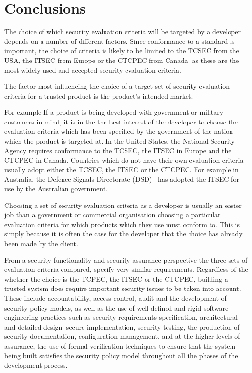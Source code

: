 \chapter{Conclusions}

The choice of which security evaluation criteria will be targeted by a
developer depends on a number of different factors. Since conformance to
a standard is important, the choice of criteria is likely to be limited
to the TCSEC from the USA, the ITSEC from Europe or the CTCPEC from Canada, 
as these are the most widely used and accepted security evaluation criteria.

The factor most influencing the choice of a target set of security
evaluation criteria for a trusted product is the product's intended
market.

For example If a product is being developed with government or military customers in
mind, it is in the the best interest of the developer to choose the
evaluation criteria which has been specified by the government of the
nation which the product is targeted at. In the United States, the
National Security Agency requires conformance to the TCSEC, the ITSEC in
Europe and the CTCPEC in Canada. Countries which do not have their own
evaluation criteria usually adopt either the TCSEC, the ITSEC or the
CTCPEC. For example in Australia, the Defence Signals Directorate (DSD)~\cite{dsd} 
has adopted the ITSEC for use by the Australian government.

Choosing a set of security evaluation criteria as a developer is usually
an easier job than a government or commercial organisation choosing
a particular evaluation criteria for which products which they use must
conform to. This is simply because it is often the case for the
developer that the choice has already been made by the client.

From a security functionality and security assurance perspective the
three sets of evaluation criteria compared, specify very similar
requirements. Regardless of the whether the choice is the TCPEC, the
ITSEC or the CTCPEC, building a trusted system does require important
security issues to be taken into account.
These include accountability, access control, audit and the development of 
security policy models, as well as the use of well defined and rigid
software engineering practices such as security requirements
specification, architectural and detailed design, secure implementation, 
security testing, the production of security documentation, 
configuration management, and at the
higher levels of assurance, the use of formal verification techniques to
ensure that the system being built satisfies the security policy model
throughout all the phases of the development process.

